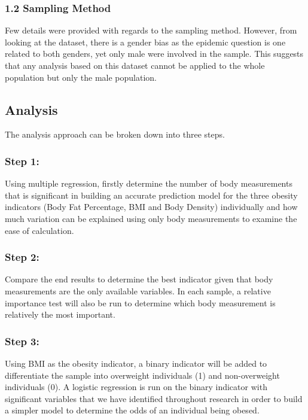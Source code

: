 \documentclass[a4paper,9pt,twocolumn,twoside,]{pinp}
\begin{document}
\hypertarget{sampling-method}{%
\subsubsection{1.2 Sampling Method}\label{sampling-method}}

Few details were provided with regards to the sampling method. However,
from looking at the dataset, there is a gender bias as the epidemic
question is one related to both genders, yet only male were involved in
the sample. This suggests that any analysis based on this dataset cannot
be applied to the whole population but only the male population.

\hypertarget{analysis}{%
\subsection{Analysis}\label{analysis}}

The analysis approach can be broken down into three steps.

\hypertarget{step-1}{%
\subsubsection{Step 1:}\label{step-1}}

Using multiple regression, firstly determine the number of body
measurements that is significant in building an accurate prediction
model for the three obesity indicators (Body Fat Percentage, BMI and
Body Density) individually and how much variation can be explained using
only body measurements to examine the ease of calculation.

\hypertarget{step-2}{%
\subsubsection{Step 2:}\label{step-2}}

Compare the end results to determine the best indicator given that body
measurements are the only available variables. In each sample, a
relative importance test will also be run to determine which body
measurement is relatively the most important.

\hypertarget{step-3}{%
\subsubsection{Step 3:}\label{step-3}}

Using BMI as the obesity indicator, a binary indicator will be added to
differentiate the sample into overweight individuals (1) and
non-overweight individuals (0). A logistic regression is run on the
binary indicator with significant variables that we have identified
throughout research in order to build a simpler model to determine the
odds of an individual being obesed.
\end{document}
